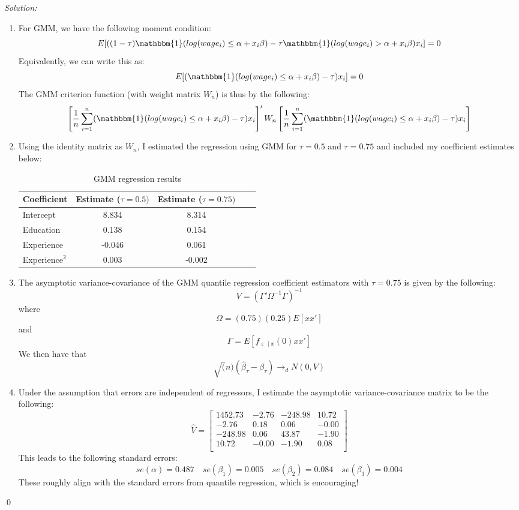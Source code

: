 \documentclass[12pt]{article}
\DeclareMathOperator{\eps}{\varepsilon}
\newenvironment{sol}
    {\emph{Solution:}
    }
    {
    \qed
    }
\begin{document}
\begin{sol}
  \begin{enumerate}[label=\alph*) ]
  \item For GMM, we have the following moment condition:
  \[E[((1-\tau) \mathbbm{1}(log(wage_i) \leq \alpha + x_i \beta ) - \tau \mathbbm{1}(log(wage_i) > \alpha + x_i \beta )x_i ] = 0\]
  Equivalently, we can write this as:
  \[E[(\mathbbm{1}(log(wage_i) \leq \alpha + x_i \beta ) - \tau) x_i] = 0\]
  The GMM criterion function (with weight matrix $W_n$) is thus by the following:
\[\left[\frac{1}{n} \sum_{i=1}^n (\mathbbm{1}(log(wage_i) \leq \alpha + x_i \beta ) - \tau) x_i\right]' W_n \left[\frac{1}{n} \sum_{i=1}^n (\mathbbm{1}(log(wage_i) \leq \alpha + x_i \beta ) - \tau) x_i\right]  \]
\item Using the identity matrix as $W_n$, I estimated the regression using GMM for $\tau = 0.5$ and $\tau = 0.75$ and included my coefficient estimates below:
\begin{table}[htbp]
  \centering
  \caption{GMM regression results}
    \begin{tabular}{lcccc}
        \toprule
          Coefficient          & Estimate ($\tau = 0.5)$  &     Estimate ($\tau = 0.75)$           \\
        \midrule
        Intercept & 8.834 &   8.314  \\
        Education & 0.138 & 0.154 \\
        Experience & -0.046 &  0.061  \\
        Experience$^2$ & 0.003 &  -0.002  \\
        \bottomrule
    \end{tabular}
  \label{tab:gmmreg}
\end{table}
\item The asymptotic variance-covariance of the GMM quantile regression coefficient estimators with $\tau = 0.75$ is given by the following:
\[V = (\Gamma' \Omega^{-1} \Gamma)^{-1}\]
where
\[\Omega = (0.75)(0.25)E[x x']\]
and 
\[\Gamma = E[f_{\eps \mid x}(0) x x']\]
We then have that
\[\sqrt(n)(\hat{\beta}_{\tau} - \beta_{\tau}) \rightarrow_d N(0, V)\]
\item Under the assumption that errors are independent of regressors, I estimate the asymptotic variance-covariance matrix to be the following:
\[\hat{V} = \begin{bmatrix}
  1452.73 & -2.76 & -248.98 & 10.72 \\ 
  -2.76 & 0.18 & 0.06 & -0.00 \\ 
  -248.98 & 0.06 & 43.87 & -1.90 \\ 
  10.72 & -0.00 & -1.90 & 0.08 \\ 
  \end{bmatrix}\]
  This leads to the following standard errors:
  \[se(\alpha) = 0.487 \quad se(\beta_1) = 0.005 \quad se(\beta_2) = 0.084 \quad se(\beta_3 ) = 0.004\]
  These roughly align with the standard errors from quantile regression, which is encouraging!


\end{enumerate}
\end{sol}
\end{document}
